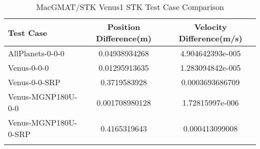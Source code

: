 \begin{table}[htbp!]
\centering
\caption{ MacGMAT/STK Venus1 STK Test Case Comparison}
      \begin{tabular}{lcc}
      \hline\hline
          Test Case & Position Difference(m) & Velocity Difference(m/s) \\
         \hline
         AllPlanets-0-0-0 & 0.04938934268 & 4.904642393e-005 \\
         Venus-0-0-0 & 0.01295913635 & 1.283094842e-005 \\
         Venus-0-0-SRP & 0.3719583928 & 0.0003693686709 \\
         Venus-MGNP180U-0-0 & 0.001708980128 & 1.72815997e-006 \\
         Venus-MGNP180U-0-SRP & 0.4165319643 & 0.000413099008 \\
      \hline\hline
      \label{Table: Venus1 STK Table} 
\end{tabular}
\end{table}
